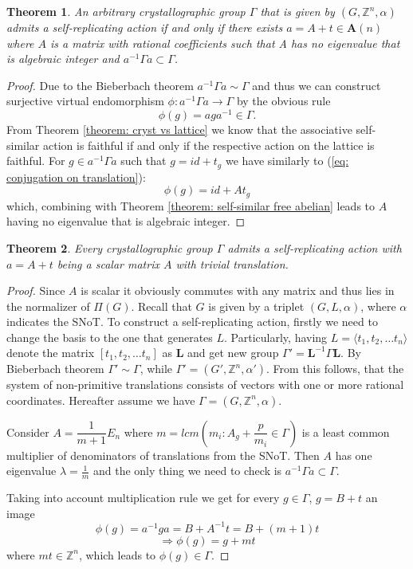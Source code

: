 \documentclass[a4paper,12pt]{amsart}
\newtheorem{theorem}{Theorem}
\theoremstyle{definition}
\begin{document}
	
	\begin{theorem} \label{theorem: cryst criterion}
		An arbitrary crystallographic group $\Gamma$ that is given by $(G, \mathbb{Z}^n, \alpha)$ admits a self-replicating action if and only if 
		there exists $a = A + t \in \mathbf{A}(n)$ where $A$ is a matrix with rational coefficients such that A has no eigenvalue that is algebraic integer and  $a^{-1} \Gamma a \subset \Gamma$. 
	\end{theorem}
	\begin{proof}
		Due to the Bieberbach theorem $a^{-1} \Gamma a \sim \Gamma$ and thus we can construct surjective virtual endomorphism $\phi : a^{-1} \Gamma a \rightarrow \Gamma$ by the obvious rule 
		$$
		\phi(g) = a g a^{-1} \in \Gamma.
		$$
		From Theorem \ref{theorem: cryst vs lattice} we know that the associative self-similar action is faithful if and only if the respective action on the lattice is faithful. For $g \in a^{-1}\Gamma a$  such that $g = id + t_g$ we have similarly to (\ref{eq: conjugation on translation}): 
		$$
		\phi(g) = id + At_g
		$$
		which, combining with Theorem \ref{theorem: self-similar free abelian} leads to $A$ having no eigenvalue that is algebraic integer. 
			 
	\end{proof}

	\begin{theorem} \label{theorem: self-replicating action for cryst}
		Every crystallographic group $\Gamma$ admits a self-replicating action with $a=A+t$ being a scalar matrix $A$ with trivial translation.  
	\end{theorem}

	\begin{proof}
		Since $A$ is scalar it obviously commutes with any matrix and thus lies in the normalizer of $\Pi(G)$. Recall that $G$ is given by a triplet $(G, L, \alpha)$, where $\alpha$ indicates the SNoT. To construct a self-replicating action, firstly we need to change the basis to the one that generates $L$. Particularly, having $L = \langle t_1, t_2, \dots t_n \rangle$ denote  the matrix $[t_1, t_2, \dots t_n]$ as $\mathbf{L}$ and get new group $\Gamma' = \mathbf{L}^{-1}\Gamma\mathbf{L}$. By Bieberbach theorem $\Gamma' \sim \Gamma$, while $\Gamma' = (G', \mathbb{Z}^n, \alpha')$. From this follows, that the system of non-primitive translations consists of vectors with one or more rational coordinates. Hereafter assume we have $\Gamma = (G, \mathbb{Z}^n, \alpha)$.
		
		Consider $A = \dfrac{1}{m+1}E_n$ where $m = lcm \left(m_i : A_g + \dfrac{p}{m_i} \in \Gamma \right)$ is a least common multiplier of denominators of translations from the SNoT. Then $A$ has one eigenvalue $\lambda = \frac{1}{m}$ and the only thing we need to check is $a^{-1}\Gamma a \subset \Gamma$.
		
		Taking into account multiplication rule we get for every $g \in \Gamma$, $g = B + t$ an image 
		$$
		\phi(g) = a^{-1} g a = B + A^{-1}t = B + (m+1)t
		$$
		$$
		\Rightarrow \phi(g) = g + mt
		$$
		where $mt \in \mathbb{Z}^n$, which leads to $\phi(g) \in \Gamma$.
	\end{proof}
	
\end{document}
